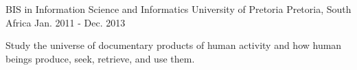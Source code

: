 

\begin{cventries}

  \cventry
    {BIS in Information Science and Informatics} %
    {University of Pretoria} %
    {Pretoria, South Africa} %
    {Jan. 2011 - Dec. 2013} %
    {
      \begin{cvitems} %
        \item {Study the universe of documentary products of human activity and how human beings produce, seek, retrieve, and use them.}
      \end{cvitems}
    }
\end{cventries}

